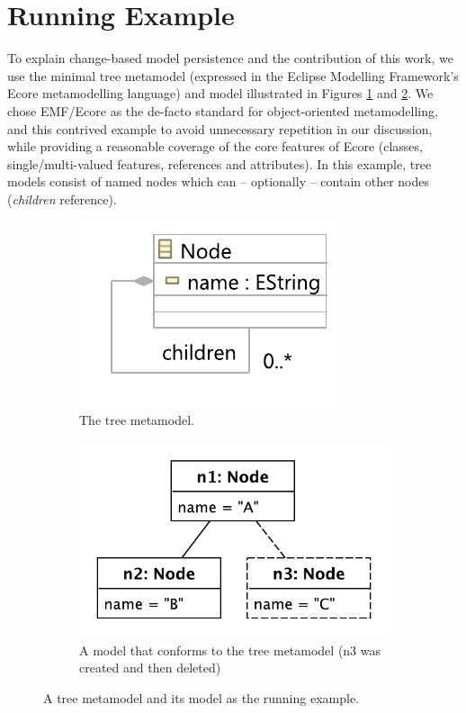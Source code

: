 \documentclass{llncs}
\begin{document}
\section{Running Example}
\label{sec:case_study}
To explain change-based model persistence and the contribution of this work, we use the minimal tree metamodel (expressed in the Eclipse Modelling Framework's Ecore metamodelling language) and model illustrated in Figures \ref{fig:tree_metamodel} and \ref{fig:initial_model}.
We chose EMF/Ecore as the de-facto standard for object-oriented metamodelling, and this contrived example to avoid unnecessary repetition in our discussion, while providing a reasonable coverage of the core features of Ecore (classes, single/multi-valued features, references and attributes).
In this example, tree models consist of named nodes which can -- optionally -- contain other nodes (\emph{children} reference).

\begin{figure}[ht]
    \begin{subfigure}[t]{0.4\linewidth}
        \centering
        \includegraphics[width=0.8\linewidth]{node_metamodel}
        \caption{The tree metamodel.}
        \label{fig:tree_metamodel}
    \end{subfigure}
    \hfill
    \begin{subfigure}[t]{0.6\linewidth}
        \centering
        \includegraphics[width=0.6\linewidth]{initial_chart}
        \caption{A model that conforms to the tree metamodel (n3 was created and then deleted)}
        \label{fig:initial_model}
    \end{subfigure}
    \caption{A tree metamodel and its model as the running example.}
    \label{fig:append_speed}
\end{figure}
\end{document}

